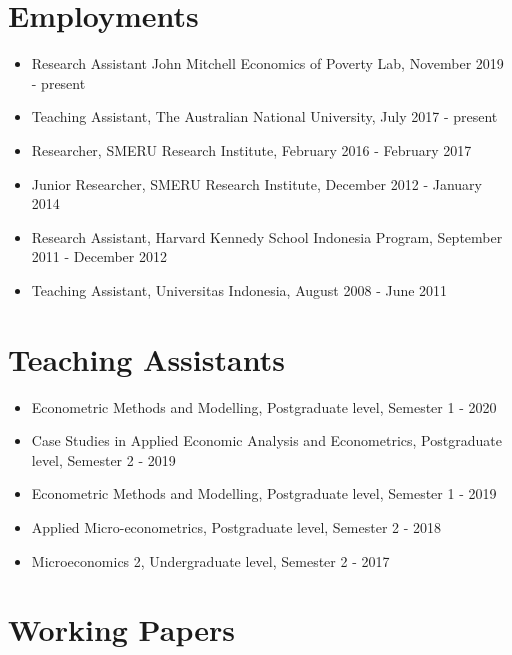 \section*{Employments}

\begin{itemize}
\item Research Assistant John Mitchell Economics of Poverty Lab, November 2019 - present
\item Teaching Assistant, The Australian National University, July 2017 - present
\item Researcher, SMERU Research Institute, February 2016 - February 2017
\item Junior Researcher, SMERU Research Institute, December 2012 - January 2014
\item Research Assistant, Harvard Kennedy School Indonesia Program, September 2011 - December 2012
\item Teaching Assistant, Universitas Indonesia, August 2008 - June 2011
\end{itemize}

\section*{Teaching Assistants}

\begin{itemize}
\item Econometric Methods and Modelling, Postgraduate level, Semester 1 - 2020
\item Case Studies in Applied Economic Analysis and Econometrics, Postgraduate level, Semester 2 - 2019
\item Econometric Methods and Modelling, Postgraduate level, Semester 1 - 2019
\item Applied Micro-econometrics, Postgraduate level, Semester 2 - 2018
\item Microeconomics 2, Undergraduate level, Semester 2 - 2017

\end{itemize}

\section*{Working Papers}

